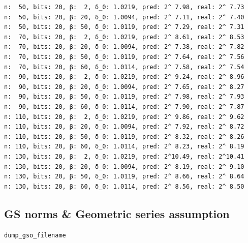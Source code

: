 \documentclass[10pt,a4paper,nobib]{tufte-handout}
\begin{document}
\begin{verbatim}
n:  50, bits: 20, β:  2, δ_0: 1.0219, pred: 2^ 7.98, real: 2^ 7.73
n:  50, bits: 20, β: 20, δ_0: 1.0094, pred: 2^ 7.11, real: 2^ 7.40
n:  50, bits: 20, β: 50, δ_0: 1.0119, pred: 2^ 7.29, real: 2^ 7.31
n:  70, bits: 20, β:  2, δ_0: 1.0219, pred: 2^ 8.61, real: 2^ 8.53
n:  70, bits: 20, β: 20, δ_0: 1.0094, pred: 2^ 7.38, real: 2^ 7.82
n:  70, bits: 20, β: 50, δ_0: 1.0119, pred: 2^ 7.64, real: 2^ 7.56
n:  70, bits: 20, β: 60, δ_0: 1.0114, pred: 2^ 7.58, real: 2^ 7.54
n:  90, bits: 20, β:  2, δ_0: 1.0219, pred: 2^ 9.24, real: 2^ 8.96
n:  90, bits: 20, β: 20, δ_0: 1.0094, pred: 2^ 7.65, real: 2^ 8.27
n:  90, bits: 20, β: 50, δ_0: 1.0119, pred: 2^ 7.98, real: 2^ 7.93
n:  90, bits: 20, β: 60, δ_0: 1.0114, pred: 2^ 7.90, real: 2^ 7.87
n: 110, bits: 20, β:  2, δ_0: 1.0219, pred: 2^ 9.86, real: 2^ 9.62
n: 110, bits: 20, β: 20, δ_0: 1.0094, pred: 2^ 7.92, real: 2^ 8.72
n: 110, bits: 20, β: 50, δ_0: 1.0119, pred: 2^ 8.32, real: 2^ 8.26
n: 110, bits: 20, β: 60, δ_0: 1.0114, pred: 2^ 8.23, real: 2^ 8.19
n: 130, bits: 20, β:  2, δ_0: 1.0219, pred: 2^10.49, real: 2^10.41
n: 130, bits: 20, β: 20, δ_0: 1.0094, pred: 2^ 8.19, real: 2^ 9.10
n: 130, bits: 20, β: 50, δ_0: 1.0119, pred: 2^ 8.66, real: 2^ 8.64
n: 130, bits: 20, β: 60, δ_0: 1.0114, pred: 2^ 8.56, real: 2^ 8.50
\end{verbatim}

\subsection{GS norms \& Geometric series assumption}
\label{sec:orgd4bb373}

\texttt{dump\_gso\_filename}
\end{document}
